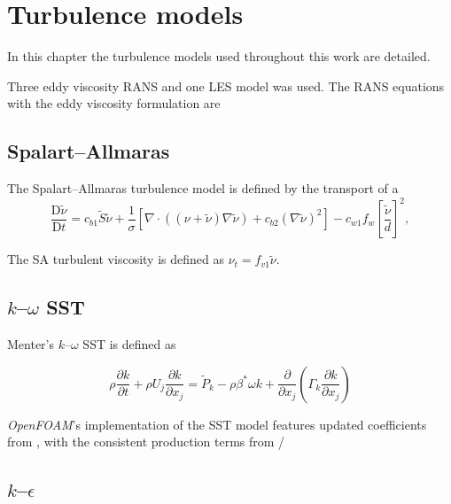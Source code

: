 \chapter{Turbulence models}
\doublespace

In this chapter the turbulence models used throughout this work are detailed.

Three eddy viscosity RANS and one LES model was used. The RANS equations with
the eddy viscosity formulation are



\section{Spalart--Allmaras}

The Spalart--Allmaras turbulence model is defined by the transport of a
\begin{equation}
\frac{\mathrm{D} \tilde{\nu}}{\mathrm{D} t}
= c_{b1} \tilde{S} \tilde{\nu}
+ \frac{1}{\sigma}
\left[
\nabla \cdot \left( (\nu + \tilde{\nu}) \nabla \tilde{\nu} \right)
+ c_{b2} (\nabla \tilde{\nu})^2
\right]
- c_{w1} f_w \left[ \frac{\tilde{\nu}}{d} \right]^2,
\label{eq:SA}
\end{equation}

The SA turbulent viscosity is defined as $\nu_t = f_{v1} \tilde{\nu}$.


\section{$k$--$\omega$ SST}

Menter's $k$--$\omega$ SST is defined as \cite{Menter2001}

\begin{equation}
    \rho \frac{\partial k}{\partial t}
    + \rho U_j \frac{\partial k}{\partial x_j}
    = \tilde{P}_k - \rho \beta^* \omega k
    + \frac{\partial}{\partial x_j}
    \left(
    \Gamma_k \frac{\partial k}{\partial x_j}
    \right)
    \label{eq:komegasst-k}
\end{equation}

\textit{OpenFOAM}'s implementation of the SST model features updated
coefficients from \cite{Menter2003}, with the consistent production terms from
\cite{Menter2001}/


\section{$k$--$\epsilon$}

